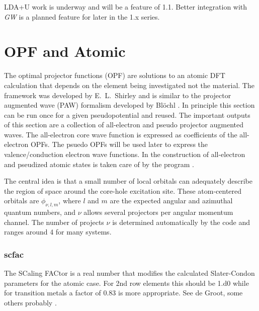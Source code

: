 \documentclass[11pt]{report}
\begin{document}
LDA+U work is underway and will be a feature of  1.1. Better integration with {\it GW} is a planned feature for later in the 1.x series. 


\chapter{OPF and Atomic}
\label{opf}

The optimal projector functions (OPF) are solutions to an atomic DFT calculation that depends on the element being investigated not the material. 
The framework was developed by E.\ L.\ Shirley \cite{ShirleyOPF} and is similar to the projector augmented wave (PAW) formalism developed by Bl\"{o}chl \cite{PhysRevB.50.17953}. 
%
In principle this section can be run once for a given pseudopotential and reused. 
The important outputs of this section are a collection of all-electron and pseudo projector augmented waves. 
The all-electron core wave function is expressed as coefficients of the all-electron OPFs. 
The psuedo OPFs will be used later to express the valence/conduction electron wave functions.
%
In  
the construction of all-electron and pseudized atomic states is taken care of by the program . 

The central idea is that a small number of local orbitals can adequately describe the region of space around the 
core-hole excitation site. These atom-centered orbitals are $\phi_{\nu,l,m}$, where $l$ and $m$ are the 
expected angular and azimuthal quantum numbers, and $\nu$ allows several projectors per angular momentum channel. 
The number of projects $\nu$ is determined automatically by the code and ranges around 4 for many systems. 

\subsection{scfac}
The SCaling FACtor is a real number that modifies the calculated Slater-Condon parameters for the atomic case. For 2nd row elements this should be 1.d0 while for transition metals a factor of 0.83 is more appropriate. See de Groot, some others probably \cite{degroot.book}.
\end{document}

